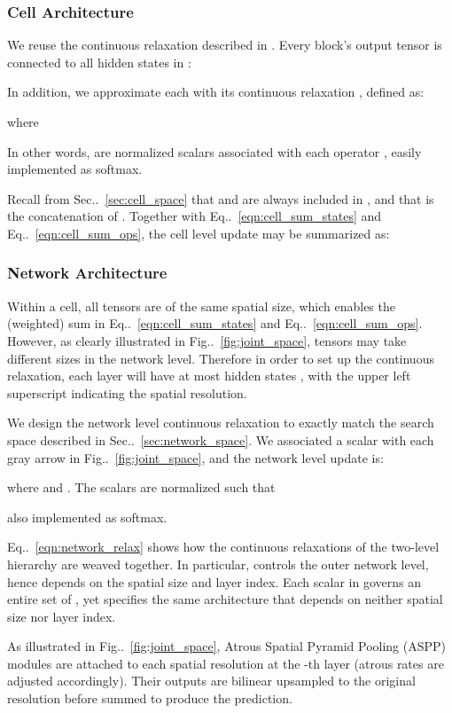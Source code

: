 \documentclass[10pt,twocolumn,letterpaper]{article}
\makeatletter
\def\@onedot{\ifx\@let@token.\else.\null\fi\xspace}
\DeclareRobustCommand\onedot{\futurelet\@let@token\@onedot}
\newcommand{\figref}[1]{Fig\onedot~\ref{#1}}
\newcommand{\equref}[1]{Eq\onedot~\eqref{#1}}
\newcommand{\secref}[1]{Sec\onedot~\ref{#1}}
\makeatother
\begin{document}
\subsubsection{Cell Architecture}
\label{sec:relax_cell}

We reuse the continuous relaxation described in \cite{liu2018darts}.
Every block's output tensor  is connected to all hidden states in :

In addition, we approximate each  with its continuous relaxation , defined as:

where

In other words,  are normalized scalars associated with each operator , easily implemented as softmax.

Recall from \secref{sec:cell_space} that  and  are always included in , and that  is the concatenation of .
Together with \equref{eqn:cell_sum_states} and \equref{eqn:cell_sum_ops}, the cell level update may be summarized as:


\subsubsection{Network Architecture}
\label{sec:relax_network}

Within a cell, all tensors are of the same spatial size, which enables the (weighted) sum in \equref{eqn:cell_sum_states} and \equref{eqn:cell_sum_ops}.
However, as clearly illustrated in \figref{fig:joint_space}, tensors may take different sizes in the network level. 
Therefore in order to set up the continuous relaxation, each layer  will have at most  hidden states , with the upper left superscript indicating the spatial resolution.

We design the network level continuous relaxation to exactly match the search space described in \secref{sec:network_space}.
We associated a scalar with each gray arrow in \figref{fig:joint_space}, and the network level update is:

where  and .
The scalars  are normalized such that

also implemented as softmax.

\equref{eqn:network_relax} shows how the continuous relaxations of the two-level hierarchy are weaved together. In particular, 
 controls the outer network level, hence depends on the spatial size and layer index.
Each scalar in  governs an entire set of , yet  specifies the same architecture that depends on neither spatial size nor layer index.

As illustrated in \figref{fig:joint_space}, Atrous Spatial Pyramid Pooling (ASPP) modules are attached to each spatial resolution at the -th layer (atrous rates are adjusted accordingly).
Their outputs are bilinear upsampled to the original resolution before summed to produce the prediction.
\end{document}
